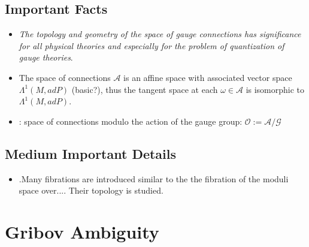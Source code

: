 \documentclass[12pt]{report}
\begin{document}
\subsection{Important Facts}
\begin{itemize}
    \item \emph{The topology and geometry of the space of gauge connections has significance for all physical theories and especially for the problem of quantization of gauge theories}.
    
    \item The space of connections $\mathcal A$ is an affine space with associated vector space $\Lambda^1(M, ad P)$ (basic?), thus the tangent space at each $\omega \in \mathcal A$ is isomorphic to $\Lambda^1(M, ad P)$.
    
    \item {}: space of connections modulo the action of the gauge group: $\mathcal O := \mathcal{A/G}$
    
    
\end{itemize}

\subsection{Medium Important Details}
\begin{itemize}
    \item .Many fibrations are introduced similar to the the fibration of the moduli space over.... Their topology is studied.
\end{itemize}

\section{Gribov Ambiguity}
\end{document}
